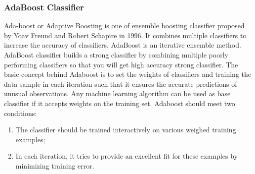         \subsubsection{AdaBoost Classifier}
            Ada-boost or Adaptive Boosting is one of ensemble boosting classifier proposed by Yoav Freund and Robert Schapire in 1996. It combines multiple classifiers to increase the accuracy of classifiers. AdaBoost is an iterative ensemble method. 
            AdaBoost classifier builds a strong classifier by combining multiple poorly performing classifiers so that you will get high accuracy strong classifier. The basic concept behind Adaboost is to set the weights of classifiers and training the 
            data sample in each iteration such that it ensures the accurate predictions of unusual observations. Any machine learning algorithm can be used as base classifier if it accepts weights on the training set. Adaboost should meet two conditions:
            \begin{enumerate}
                \item The classifier should be trained interactively on various weighed training examples;
                \item In each iteration, it tries to provide an excellent fit for these examples by minimizing training error.
            \end{enumerate}

